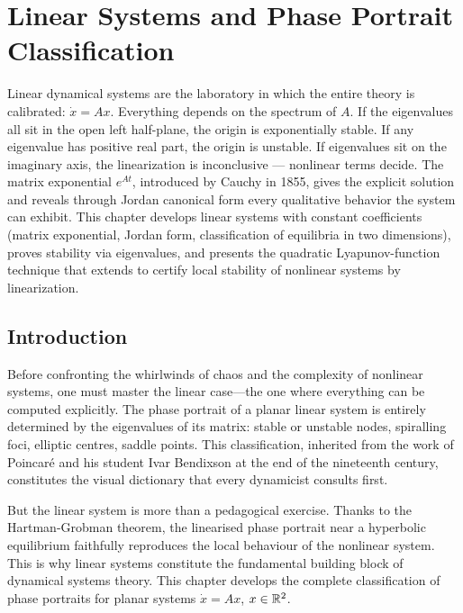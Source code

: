 \chapter{Linear Systems and Phase Portrait Classification}
\label{ch:linear}

Linear dynamical systems are the laboratory in which the entire theory is calibrated: $\dot x = Ax$. Everything depends on the spectrum of $A$. If the eigenvalues all sit in the open left half-plane, the origin is exponentially stable. If any eigenvalue has positive real part, the origin is unstable. If eigenvalues sit on the imaginary axis, the linearization is inconclusive --- nonlinear terms decide. The matrix exponential $e^{At}$, introduced by Cauchy in 1855, gives the explicit solution and reveals through Jordan canonical form every qualitative behavior the system can exhibit. This chapter develops linear systems with constant coefficients (matrix exponential, Jordan form, classification of equilibria in two dimensions), proves stability via eigenvalues, and presents the quadratic Lyapunov-function technique that extends to certify local stability of nonlinear systems by linearization.

\section{Introduction}

Before confronting the whirlwinds of chaos and the complexity of nonlinear systems, one must master the linear case---the one where everything can be computed explicitly. The phase portrait of a planar linear system is entirely determined by the eigenvalues of its matrix: stable or unstable nodes, spiralling foci, elliptic centres, saddle points. This classification, inherited from the work of Poincar\'e and his student Ivar Bendixson at the end of the nineteenth century, constitutes the visual dictionary that every dynamicist consults first.

But the linear system is more than a pedagogical exercise. Thanks to the Hartman-Grobman theorem, the linearised phase portrait near a hyperbolic equilibrium faithfully reproduces the local behaviour of the nonlinear system. This is why linear systems constitute the fundamental building block of dynamical systems
theory. This chapter develops the
complete classification of phase portraits for planar systems
$\dot{x} = Ax$, $x \in \mathbb{R}^2$.


